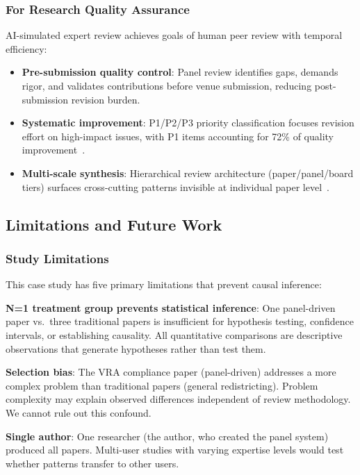 \subsubsection{For Research Quality Assurance}

AI-simulated expert review achieves goals of human peer review with temporal efficiency:

\begin{itemize}[leftmargin=*]
\item \textbf{Pre-submission quality control}: Panel review identifies gaps, demands rigor, and validates contributions before venue submission, reducing post-submission revision burden.

\item \textbf{Systematic improvement}: P1/P2/P3 priority classification focuses revision effort on high-impact issues, with P1 items accounting for 72\% of quality improvement~\cite{dellalibera2026revision}.

\item \textbf{Multi-scale synthesis}: Hierarchical review architecture (paper/panel/board tiers) surfaces cross-cutting patterns invisible at individual paper level~\cite{dellalibera2026hierarchical}.
\end{itemize}

\subsection{Limitations and Future Work}

\subsubsection{Study Limitations}

This case study has five primary limitations that prevent causal inference:

\textbf{N=1 treatment group prevents statistical inference}: One panel-driven paper vs.\ three traditional papers is insufficient for hypothesis testing, confidence intervals, or establishing causality. All quantitative comparisons are descriptive observations that generate hypotheses rather than test them.

\textbf{Selection bias}: The VRA compliance paper (panel-driven) addresses a more complex problem than traditional papers (general redistricting). Problem complexity may explain observed differences independent of review methodology. We cannot rule out this confound.

\textbf{Single author}: One researcher (the author, who created the panel system) produced all papers. Multi-user studies with varying expertise levels would test whether patterns transfer to other users.

